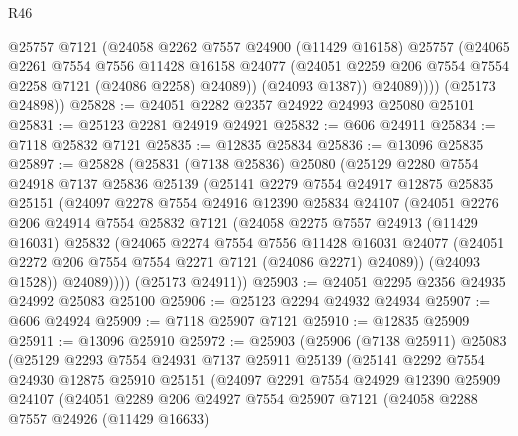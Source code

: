 \begin{lexlean}{R46}
\begin{coremodule}
              @25757
              @7121
              (@24058
                @2262
                @7557
                @24900
                (@11429 @16158)
                @25757
                (@24065
                  @2261
                  @7554
                  @7556
                  @11428
                  @16158
                  @24077
                  (@24051 @2259 @206 @7554 @7554 @2258 @7121 (@24086 @2258) @24089))
                (@24093 @1387))
              @24089))))
      (@25173 @24898))
@25828 := @24051 @2282 @2357 @24922 @24993 @25080 @25101
@25831 := @25123 @2281 @24919 @24921
@25832 := @606 @24911
@25834 := @7118 @25832 @7121
@25835 := @12835 @25834
@25836 := @13096 @25835
@25897 := @25828
    (@25831
      (@7138 @25836)
      @25080
      (@25129
        @2280
        @7554
        @24918
        @7137
        @25836
        @25139
        (@25141
          @2279
          @7554
          @24917
          @12875
          @25835
          @25151
          (@24097
            @2278
            @7554
            @24916
            @12390
            @25834
            @24107
            (@24051
              @2276
              @206
              @24914
              @7554
              @25832
              @7121
              (@24058
                @2275
                @7557
                @24913
                (@11429 @16031)
                @25832
                (@24065
                  @2274
                  @7554
                  @7556
                  @11428
                  @16031
                  @24077
                  (@24051 @2272 @206 @7554 @7554 @2271 @7121 (@24086 @2271) @24089))
                (@24093 @1528))
              @24089))))
      (@25173 @24911))
@25903 := @24051 @2295 @2356 @24935 @24992 @25083 @25100
@25906 := @25123 @2294 @24932 @24934
@25907 := @606 @24924
@25909 := @7118 @25907 @7121
@25910 := @12835 @25909
@25911 := @13096 @25910
@25972 := @25903
    (@25906
      (@7138 @25911)
      @25083
      (@25129
        @2293
        @7554
        @24931
        @7137
        @25911
        @25139
        (@25141
          @2292
          @7554
          @24930
          @12875
          @25910
          @25151
          (@24097
            @2291
            @7554
            @24929
            @12390
            @25909
            @24107
            (@24051
              @2289
              @206
              @24927
              @7554
              @25907
              @7121
              (@24058
                @2288
                @7557
                @24926
                (@11429 @16633)

\end{coremodule}
\end{lexlean}
